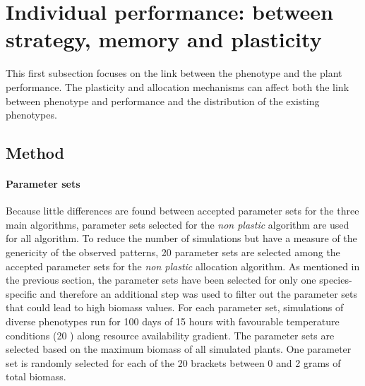 \section{Individual performance: between strategy, memory and plasticity}

This first subsection focuses on the link between the phenotype and the plant performance. The plasticity and allocation mechanisms can affect both the link between phenotype and performance and the distribution of the existing phenotypes.



\subsection{Method}

\paragraph{Parameter sets}
Because little differences are found between accepted parameter sets for the three main algorithms, parameter sets selected for the \textit{non plastic} algorithm are used for all algorithm. To reduce the number of simulations but have a measure of the genericity of the observed patterns, 20 parameter sets are selected among the accepted parameter sets for the \textit{non plastic} allocation algorithm. As mentioned in the previous section, the parameter sets have been selected for only one species-specific and therefore an additional step was used to filter out the parameter sets that could lead to high biomass values. For each parameter set, simulations of diverse phenotypes run for 100 days of 15 hours with favourable temperature conditions (20 \celsius) along resource availability gradient. The parameter sets are selected based on the maximum biomass of all simulated plants. One parameter set is randomly selected for each of the 20 brackets between 0 and 2 grams of total biomass.

